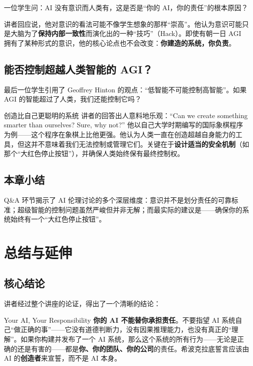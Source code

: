 \documentclass[a4paper]{article}
\begin{document}
一位学生问：AI 没有意识而人类有，这是否是``你的 AI，你的责任''的根本原因？

讲者回应说，他对意识的看法可能不像学生想象的那样``崇高''。他认为意识可能只是大脑为了\textbf{保持内部一致性}而演化出的一种``技巧''（Hack）。即使有朝一日 AGI 拥有了某种形式的意识，他的核心论点也不会改变：\textbf{你建造的系统，你负责}。

\subsection{能否控制超越人类智能的 AGI？}

最后一位学生引用了 Geoffrey Hinton 的观点：``低智能不可能控制高智能''。如果 AGI 的智能超过了人类，我们还能控制它吗？

\begin{knowledgebox}{创造比自己更聪明的系统}
讲者的回答出人意料地乐观：``Can we create something smarter than ourselves? Sure, why not?'' 他以自己大学时期编写的国际象棋程序为例——这个程序在象棋上比他更强。他认为人类一直在创造超越自身能力的工具，但这并不意味着我们无法控制或管理它们。关键在于\textbf{设计适当的安全机制}（如那个``大红色停止按钮''），并确保人类始终保有最终控制权。
\end{knowledgebox}

\subsection{本章小结}

Q\&A 环节揭示了 AI 伦理讨论的多个深层维度：意识并不是划分责任的可靠标准；超级智能的控制问题虽然严峻但并非无解；而最实际的建议是——确保你的系统始终有一个``大红色停止按钮''。

\section{总结与延伸}

\subsection{核心结论}

讲者经过整个讲座的论证，得出了一个清晰的结论：

\begin{importantbox}{{Your AI, Your Responsibility}}
\textbf{你的 AI 不能替你承担责任}。不要指望 AI 系统自己``做正确的事''——它没有道德判断力，没有因果推理能力，也没有真正的``理解''。如果你构建并发布了一个 AI 系统，那么这个系统的所有行为——无论是正确的还是有害的——都是\textbf{你、你的团队、你的公司}的责任。希波克拉底誓言应该由 AI 的\textbf{创造者}来宣誓，而不是 AI 本身。
\end{importantbox}
\end{document}
